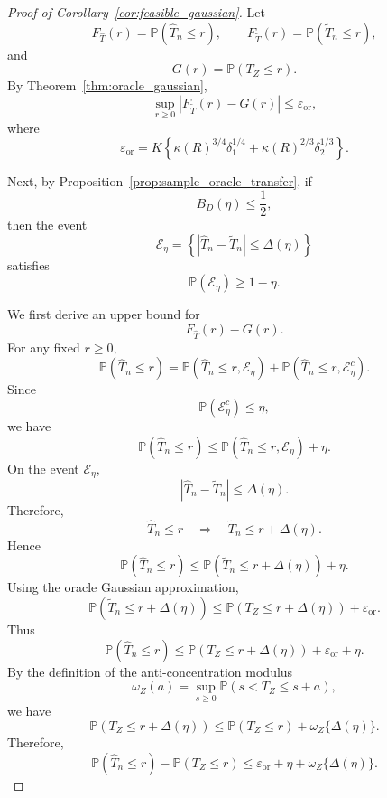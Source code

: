 \documentclass[
  12pt]{article}
\theoremstyle{plain}
\theoremstyle{definition}
\theoremstyle{remark}
\begin{document}
\begin{proof}[Proof of Corollary~\ref{cor:feasible_gaussian}]
Let
\[
F_{\widehat T}(r)
=
\mathbb P(\widehat T_n\le r),
\qquad
F_{\widetilde T}(r)
=
\mathbb P(\widetilde T_n\le r),
\]
and
\[
G(r)
=
\mathbb P(T_Z\le r).
\]
By Theorem~\ref{thm:oracle_gaussian},
\[
\sup_{r\ge0}
\left|
F_{\widetilde T}(r)-G(r)
\right|
\le
\varepsilon_{\mathrm{or}},
\]
where
\[
\varepsilon_{\mathrm{or}}
=
K
\left\{
\kappa(R)^{3/4}\delta_1^{1/4}
+
\kappa(R)^{2/3}\delta_2^{1/3}
\right\}.
\]

Next, by Proposition~\ref{prop:sample_oracle_transfer}, if
\[
B_D(\eta)\le \frac12,
\]
then the event
\[
\mathcal E_\eta
=
\left\{
|\widehat T_n-\widetilde T_n|\le \Delta(\eta)
\right\}
\]
satisfies
\[
\mathbb P(\mathcal E_\eta)\ge 1-\eta.
\]

We first derive an upper bound for
\[
F_{\widehat T}(r)-G(r).
\]
For any fixed \(r\ge0\),
\[
\mathbb P(\widehat T_n\le r)
=
\mathbb P(\widehat T_n\le r,\mathcal E_\eta)
+
\mathbb P(\widehat T_n\le r,\mathcal E_\eta^c).
\]
Since
\[
\mathbb P(\mathcal E_\eta^c)\le \eta,
\]
we have
\[
\mathbb P(\widehat T_n\le r)
\le
\mathbb P(\widehat T_n\le r,\mathcal E_\eta)
+
\eta.
\]
On the event \(\mathcal E_\eta\),
\[
|\widehat T_n-\widetilde T_n|\le \Delta(\eta).
\]
Therefore,
\[
\widehat T_n\le r
\quad\Longrightarrow\quad
\widetilde T_n\le r+\Delta(\eta).
\]
Hence
\[
\mathbb P(\widehat T_n\le r)
\le
\mathbb P(\widetilde T_n\le r+\Delta(\eta))
+
\eta.
\]
Using the oracle Gaussian approximation,
\[
\mathbb P(\widetilde T_n\le r+\Delta(\eta))
\le
\mathbb P(T_Z\le r+\Delta(\eta))
+
\varepsilon_{\mathrm{or}}.
\]
Thus
\[
\mathbb P(\widehat T_n\le r)
\le
\mathbb P(T_Z\le r+\Delta(\eta))
+
\varepsilon_{\mathrm{or}}
+
\eta.
\]
By the definition of the anti-concentration modulus
\[
\omega_Z(a)
=
\sup_{s\ge0}\mathbb P(s<T_Z\le s+a),
\]
we have
\[
\mathbb P(T_Z\le r+\Delta(\eta))
\le
\mathbb P(T_Z\le r)
+
\omega_Z\{\Delta(\eta)\}.
\]
Therefore,
\[
\mathbb P(\widehat T_n\le r)-\mathbb P(T_Z\le r)
\le
\varepsilon_{\mathrm{or}}
+
\eta
+
\omega_Z\{\Delta(\eta)\}.
\]


\end{proof}
\end{document}
